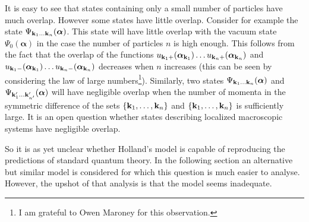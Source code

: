 \documentclass[12pt]{article}
\begin{document}
It is easy to see that states containing only a small number of particles have much overlap. However some states have little overlap. Consider for example the state $\Psi_{{\bf k}_1 \dots {\bf k}_n}({\boldsymbol \alpha})$. This state will have little overlap with the vacuum state $\Psi_0({\boldsymbol \alpha})$ in the case the number of particles $n$ is high enough. This follows from the fact that the overlap of the functions $u_{{\bf k}_1 +}({\boldsymbol \alpha}_{{\bf k}_1}) \dots u_{{\bf k}_n +}({\boldsymbol \alpha}_{{\bf k}_n})$ and $u_{{\bf k}_1 -}({\boldsymbol \alpha}_{{\bf k}_1}) \dots u_{{\bf k}_n -}({\boldsymbol \alpha}_{{\bf k}_n})$ decreases when $n$ increases (this can be seen by considering the law of large numbers{\footnote{I am grateful to Owen Maroney for this observation.}}). Similarly, two states $\Psi_{{\bf k}_1 \dots {\bf k}_n}({\boldsymbol \alpha})$ and $\Psi_{{\bf k}'_1 \dots {\bf k}'_{n'}}({\boldsymbol \alpha})$ will have negligible overlap when the number of momenta in the symmetric difference of the sets $\{ {\bf k}_1, \dots, {\bf k}_n\}$ and $\{ {\bf k}_1, \dots, {\bf k}_n\}$ is sufficiently large. It is an open question whether states describing localized macroscopic systems have negligible overlap.

So it is as yet unclear whether Holland's model is capable of reproducing the predictions of standard quantum theory. In the following section an alternative but similar model is considered for which this question is much easier to analyse. However, the upshot of that analysis is that the model seems inadequate.
\end{document}
